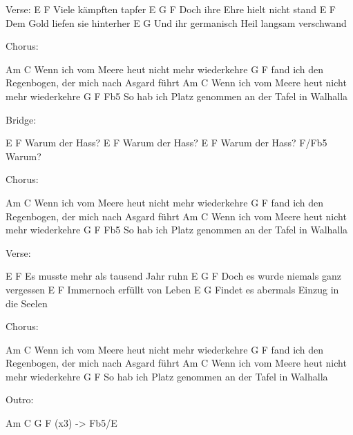 Verse:
E              F
Viele kämpften tapfer
E                          G    F
Doch ihre Ehre hielt nicht stand
E                   F
Dem Gold liefen sie hinterher
E                               G
Und ihr germanisch Heil langsam verschwand

Chorus:

Am                                 C
Wenn ich vom Meere heut nicht mehr wiederkehre
             G                         F
fand ich den Regenbogen, der mich nach Asgard führt
Am                                 C
Wenn ich vom Meere heut nicht mehr wiederkehre
           G                     F                Fb5
So hab ich Platz genommen an der Tafel in Walhalla

Bridge:

E         F
Warum der Hass?
E         F
Warum der Hass?
E         F
Warum der Hass?
F/Fb5
Warum?

Chorus:

Am                                 C
Wenn ich vom Meere heut nicht mehr wiederkehre
             G                         F
fand ich den Regenbogen, der mich nach Asgard führt
Am                                 C
Wenn ich vom Meere heut nicht mehr wiederkehre
           G                     F                Fb5
So hab ich Platz genommen an der Tafel in Walhalla

Verse:

E                          F
Es musste mehr als tausend Jahr ruhn
E                          G        F
Doch es wurde niemals ganz vergessen
E                     F
Immernoch erfüllt von Leben
E                                G
Findet es abermals Einzug in die Seelen

Chorus:

Am                                 C
Wenn ich vom Meere heut nicht mehr wiederkehre
             G                         F
fand ich den Regenbogen, der mich nach Asgard führt
Am                                 C
Wenn ich vom Meere heut nicht mehr wiederkehre
           G                     F
So hab ich Platz genommen an der Tafel in Walhalla

Outro:

Am  C  G  F (x3) -> Fb5/E
